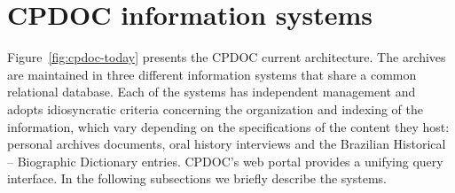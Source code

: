 
\section{CPDOC information systems}\label{sec:cpdoc}




Figure~\ref{fig:cpdoc-today} presents the CPDOC current
architecture. The archives are maintained in three different
information systems that share a common relational database. 
Each of the systems has independent management and
adopts idiosyncratic criteria concerning the organization and indexing
of the information, which vary depending on the specifications of the
content they host: personal archives documents, oral history
interviews and the Brazilian Historical -- Biographic Dictionary
entries. CPDOC's web portal provides a unifying query interface. In
the following subsections we briefly describe the systems.

